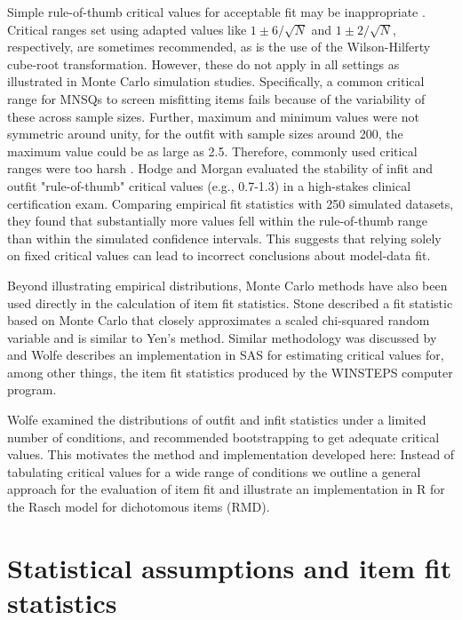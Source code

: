 \documentclass[11pt,a4paper]{article}
\begin{document}
Simple rule-of-thumb critical values for acceptable fit may be inappropriate \cite{Smith-et-al-1998,Wang-Chen-2005}. Critical ranges set using adapted values like $1\pm6/\sqrt{N}$ and $1\pm2/\sqrt{N}$, respectively, are sometimes recommended, as is the use of the Wilson-Hilferty cube-root transformation. However, these do not apply in all settings as illustrated in Monte Carlo simulation studies. Specifically, a common critical range for MNSQs to screen misfitting items fails because of the variability of these across sample sizes. Further, maximum and minimum values were not symmetric around unity, for the outfit with sample sizes around 200, the maximum value could be as large as 2.5. Therefore, commonly used critical ranges were too harsh \cite{Wang-Chen-2005,Seol2016}. Hodge and Morgan \citeyear{Hodge-Morgan-2017} evaluated the stability of infit and outfit "rule-of-thumb" critical values (e.g., 0.7-1.3) in a high-stakes clinical certification exam. Comparing empirical fit statistics with 250 simulated datasets, they found that substantially more values fell within the rule-of-thumb range than within the simulated confidence intervals. This suggests that relying solely on fixed critical values can lead to incorrect conclusions about model-data fit.

Beyond illustrating empirical distributions, Monte Carlo methods have also been used directly in the calculation of item fit statistics. Stone \citeyear{Stone-2000} described a fit statistic based on Monte Carlo that closely approximates a scaled chi-squared random variable and is similar to Yen's \citeyear{Yen-1981} method. Similar methodology was discussed by  and Wolfe \citeyear{Wolfe-2008} describes an implementation in SAS for estimating critical values for, among other things, the item fit statistics produced by the WINSTEPS computer program.

Wolfe \citeyear{Wolfe-2013} examined the distributions of outfit and infit statistics under a limited number of conditions, and recommended bootstrapping to get adequate critical values. This motivates the method and implementation developed here: Instead of tabulating critical values for a wide range of conditions we outline a general approach for the evaluation of item fit and illustrate an implementation in R for the Rasch \citeyear{Rasch-1960} model for dichotomous items (RMD).

\section{Statistical assumptions and item fit statistics}
\end{document}
